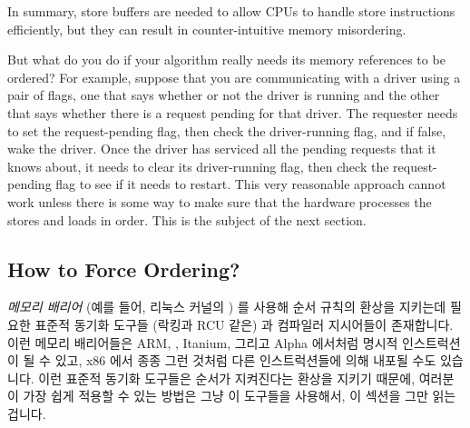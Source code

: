 In summary, store buffers are needed to allow CPUs to handle
store instructions efficiently, but they can result in
counter-intuitive memory misordering.

But what do you do if your algorithm really needs its memory
references to be ordered?
For example, suppose that you are communicating with a driver using
a pair of flags, one that says whether or not the driver is running
and the other that says whether there is a request pending for that
driver.
The requester needs to set the request-pending flag, then check
the driver-running flag, and if false, wake the driver.
Once the driver has serviced all the pending requests that it knows about,
it needs to clear its driver-running flag, then check the request-pending
flag to see if it needs to restart.
This very reasonable approach cannot work unless there is some way
to make sure that the hardware processes the stores and loads in order.
This is the subject of the next section.
\fi

\subsection{How to Force Ordering?}
\label{sec:memorder:How to Force Ordering?}

\emph{메모리 배리어} (예를 들어, 리눅스 커널의 ) 를 사용해 순서
규칙의 환상을 지키는데 필요한 표준적 동기화 도구들 (락킹과 RCU 같은) 과
컴파일러 지시어들이 존재합니다.
이런 메모리 배리어들은 ARM, \Power{}, Itanium, 그리고 Alpha 에서처럼 명시적
인스트럭션이 될 수 있고, x86 에서 종종 그런 것처럼 다른 인스트럭션들에 의해
내포될 수도 있습니다.
이런 표준적 동기화 도구들은 순서가 지켜진다는 환상을 지키기 때문에, 여러분이
가장 쉽게 적용할 수 있는 방법은 그냥 이 도구들을 사용해서, 이 섹션을 그만 읽는
겁니다.

